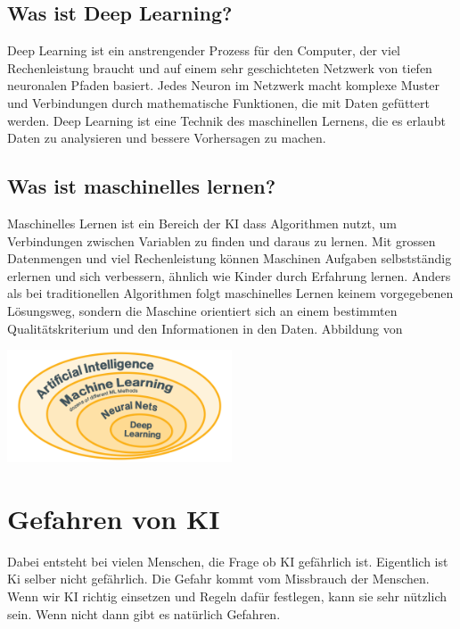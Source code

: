 \documentclass{report}
\begin{document}
\subsection{Was ist Deep Learning?}
Deep Learning ist ein anstrengender Prozess für den Computer, der viel Rechenleistung braucht und auf einem sehr geschichteten Netzwerk von tiefen neuronalen Pfaden basiert. Jedes Neuron im Netzwerk macht komplexe Muster und Verbindungen durch mathematische Funktionen, die mit Daten gefüttert werden. Deep Learning ist eine Technik des maschinellen Lernens, die es erlaubt Daten zu analysieren und bessere Vorhersagen zu machen.
\citep{ai-training-cw}

\subsection{Was ist maschinelles lernen?}
Maschinelles Lernen ist ein Bereich der KI dass Algorithmen nutzt, um Verbindungen zwischen Variablen zu finden und daraus zu lernen. Mit grossen Datenmengen und viel Rechenleistung können Maschinen Aufgaben selbstständig erlernen und sich verbessern, ähnlich wie Kinder durch Erfahrung lernen. Anders als bei traditionellen Algorithmen folgt maschinelles Lernen keinem vorgegebenen Lösungsweg, sondern die Maschine orientiert sich an einem bestimmten Qualitätskriterium und den Informationen in den Daten. 
\citep{ai-training-cw}
\newline
\newline
Abbildung von \citep{ai-training-cw}

\includegraphics[width=0.5\textwidth]{Training.png}

\section{Gefahren von KI}
Dabei entsteht bei vielen Menschen, die Frage ob KI gefährlich ist. Eigentlich ist Ki selber nicht gefährlich. Die Gefahr kommt vom Missbrauch der Menschen. Wenn wir KI richtig einsetzen und Regeln dafür festlegen, kann sie sehr nützlich sein. Wenn nicht dann gibt es natürlich Gefahren.
\citep{ai-wikipedia}



\end{document}
